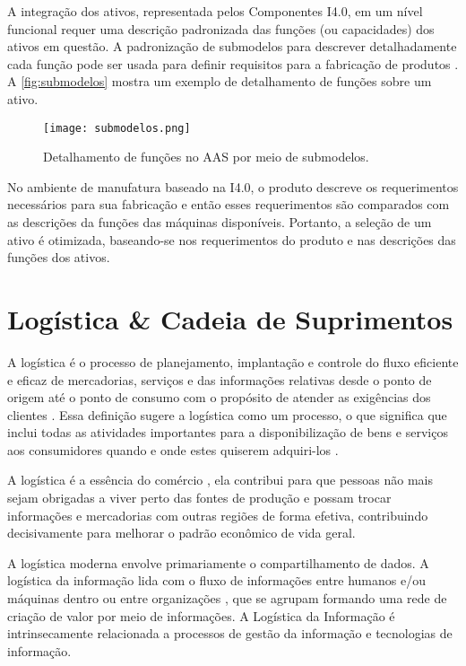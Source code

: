 	A integração dos ativos, representada pelos Componentes I4.0, em um nível funcional requer uma descrição padronizada das funções (ou capacidades) dos ativos em questão. A padronização de submodelos para descrever detalhadamente cada função pode ser usada para definir requisitos para a fabricação de produtos \cite{bedenbender2017aasexamples}. A \autoref{fig:submodelos} mostra um exemplo de detalhamento de funções sobre um ativo.
	
	\begin{figure}[htb]
		\centering
		\caption{Detalhamento de funções no AAS por meio de submodelos.}
		\label{fig:submodelos}
		\texttt{[image: submodelos.png]}
	\end{figure}

	No ambiente de manufatura baseado na I4.0, o produto descreve os requerimentos necessários para sua fabricação e então esses requerimentos são comparados com as descrições da funções das máquinas disponíveis. Portanto, a seleção de um ativo é otimizada, baseando-se nos requerimentos do produto e nas descrições das funções dos ativos.
	
	\section{Logística \& Cadeia de Suprimentos}
	
	A logística é o processo de planejamento, implantação e controle do fluxo eficiente e eficaz de mercadorias, serviços e das informações relativas desde o ponto de origem até o ponto de consumo com o propósito de atender as exigências dos clientes \cite{cscmp2013supplychainglossary}. Essa definição sugere a logística como um processo, o que significa que inclui todas as atividades importantes para a disponibilização de bens e serviços aos consumidores quando e onde estes quiserem adquiri-los \cite{ballou2006cadeiasuprimentos}.
	
	A logística é a essência do comércio \cite{ballou2006cadeiasuprimentos}, ela contribui para que pessoas não mais sejam obrigadas a viver perto das fontes de produção e possam trocar informações e mercadorias com outras regiões de forma efetiva, contribuindo decisivamente para melhorar o padrão econômico de vida geral. 
	
	A logística moderna envolve primariamente o compartilhamento de dados. A logística da informação lida com o fluxo de informações entre humanos e/ou máquinas dentro ou entre organizações \cite{haftor2009information}, que se agrupam formando uma rede de criação de valor por meio de informações. A Logística da Informação é intrinsecamente relacionada a processos de gestão da informação e tecnologias de informação.
	
